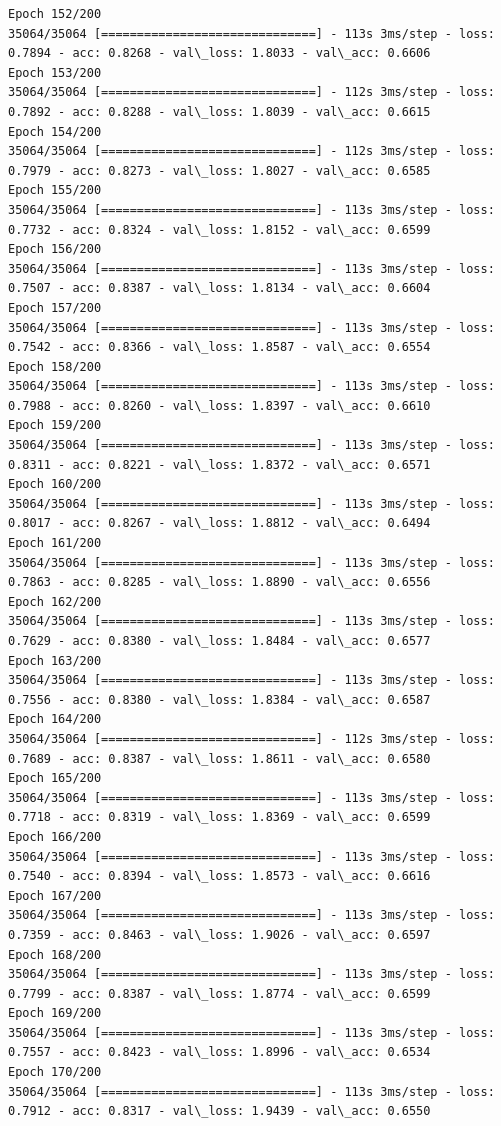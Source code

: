 \documentclass[11pt]{article}
\begin{document}
\begin{Verbatim}[commandchars=\\\{\}]
Epoch 152/200
35064/35064 [==============================] - 113s 3ms/step - loss: 0.7894 - acc: 0.8268 - val\_loss: 1.8033 - val\_acc: 0.6606
Epoch 153/200
35064/35064 [==============================] - 112s 3ms/step - loss: 0.7892 - acc: 0.8288 - val\_loss: 1.8039 - val\_acc: 0.6615
Epoch 154/200
35064/35064 [==============================] - 112s 3ms/step - loss: 0.7979 - acc: 0.8273 - val\_loss: 1.8027 - val\_acc: 0.6585
Epoch 155/200
35064/35064 [==============================] - 113s 3ms/step - loss: 0.7732 - acc: 0.8324 - val\_loss: 1.8152 - val\_acc: 0.6599
Epoch 156/200
35064/35064 [==============================] - 113s 3ms/step - loss: 0.7507 - acc: 0.8387 - val\_loss: 1.8134 - val\_acc: 0.6604
Epoch 157/200
35064/35064 [==============================] - 113s 3ms/step - loss: 0.7542 - acc: 0.8366 - val\_loss: 1.8587 - val\_acc: 0.6554
Epoch 158/200
35064/35064 [==============================] - 113s 3ms/step - loss: 0.7988 - acc: 0.8260 - val\_loss: 1.8397 - val\_acc: 0.6610
Epoch 159/200
35064/35064 [==============================] - 113s 3ms/step - loss: 0.8311 - acc: 0.8221 - val\_loss: 1.8372 - val\_acc: 0.6571
Epoch 160/200
35064/35064 [==============================] - 113s 3ms/step - loss: 0.8017 - acc: 0.8267 - val\_loss: 1.8812 - val\_acc: 0.6494
Epoch 161/200
35064/35064 [==============================] - 113s 3ms/step - loss: 0.7863 - acc: 0.8285 - val\_loss: 1.8890 - val\_acc: 0.6556
Epoch 162/200
35064/35064 [==============================] - 113s 3ms/step - loss: 0.7629 - acc: 0.8380 - val\_loss: 1.8484 - val\_acc: 0.6577
Epoch 163/200
35064/35064 [==============================] - 113s 3ms/step - loss: 0.7556 - acc: 0.8380 - val\_loss: 1.8384 - val\_acc: 0.6587
Epoch 164/200
35064/35064 [==============================] - 112s 3ms/step - loss: 0.7689 - acc: 0.8387 - val\_loss: 1.8611 - val\_acc: 0.6580
Epoch 165/200
35064/35064 [==============================] - 113s 3ms/step - loss: 0.7718 - acc: 0.8319 - val\_loss: 1.8369 - val\_acc: 0.6599
Epoch 166/200
35064/35064 [==============================] - 113s 3ms/step - loss: 0.7540 - acc: 0.8394 - val\_loss: 1.8573 - val\_acc: 0.6616
Epoch 167/200
35064/35064 [==============================] - 113s 3ms/step - loss: 0.7359 - acc: 0.8463 - val\_loss: 1.9026 - val\_acc: 0.6597
Epoch 168/200
35064/35064 [==============================] - 113s 3ms/step - loss: 0.7799 - acc: 0.8387 - val\_loss: 1.8774 - val\_acc: 0.6599
Epoch 169/200
35064/35064 [==============================] - 113s 3ms/step - loss: 0.7557 - acc: 0.8423 - val\_loss: 1.8996 - val\_acc: 0.6534
Epoch 170/200
35064/35064 [==============================] - 113s 3ms/step - loss: 0.7912 - acc: 0.8317 - val\_loss: 1.9439 - val\_acc: 0.6550

\end{Verbatim}
\end{document}
